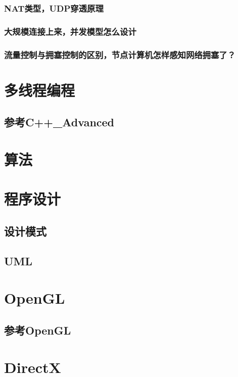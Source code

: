 \documentclass[UTF8,a4paper,8pt]{ctexart}
\begin{document}
		\subsubsection{NAT类型，UDP穿透原理}
		
		\subsubsection{大规模连接上来，并发模型怎么设计}
		
		\subsubsection{流量控制与拥塞控制的区别，节点计算机怎样感知网络拥塞了？}
		
		

\newpage
\section{多线程编程}
	\subsection{参考C++\_Advanced}

\newpage
\section{算法}


\newpage
\section{程序设计}
	\subsection{设计模式}
	\subsection{UML}

\newpage
\section{OpenGL}
	\subsection{参考OpenGL}
	
\newpage
\section{DirectX}
\end{document}
